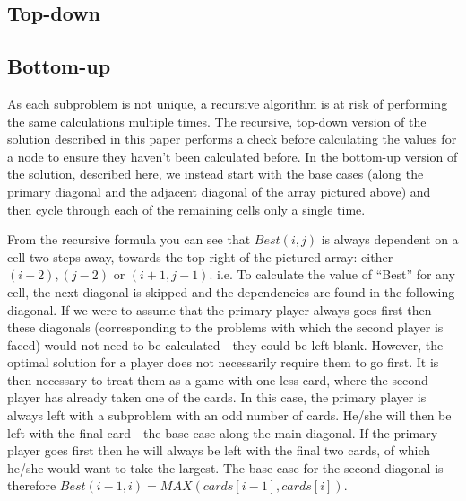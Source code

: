 \documentclass[11pt]{article}
\begin{document}
\subsection{Top-down}

\subsection{Bottom-up}
As each subproblem is not unique, a recursive algorithm is at risk of performing the same calculations multiple times. The recursive, top-down version of the solution described in this paper performs a check before calculating the values for a node to ensure they haven't been calculated before. In the bottom-up version of the solution, described here, we instead start with the base cases (along the primary diagonal and the adjacent diagonal of the array pictured above) and then cycle through each of the remaining cells only a single time.

From the recursive formula you can see that $Best(i, j)$ is always dependent on a cell two steps away, towards the top-right of the pictured
array: either $(i+2), (j-2)$ or $(i+1, j-1)$. i.e. To calculate the value of ``Best'' for any cell, the next diagonal is skipped and the 
dependencies are found in the following diagonal. If we were to assume that the primary player always goes first then these diagonals 
(corresponding to the problems with which the second player is faced) would not need to be calculated - 
they could be left blank. However, the optimal solution for a player does not necessarily require them to go first. It is 
then necessary to treat them as a game with one less card, where the second player has already taken one of the cards. 
In this case, the primary player is always left with a subproblem with an odd number of cards. He/she will then 
be left with the final card - the base case along the main diagonal. If the primary player goes first then he will always 
be left with the final two cards, of which he/she would want to take the largest. The base case for the 
second diagonal is therefore $Best(i-1, i) = MAX(cards[i-1], cards[i])$.
\end{document}
